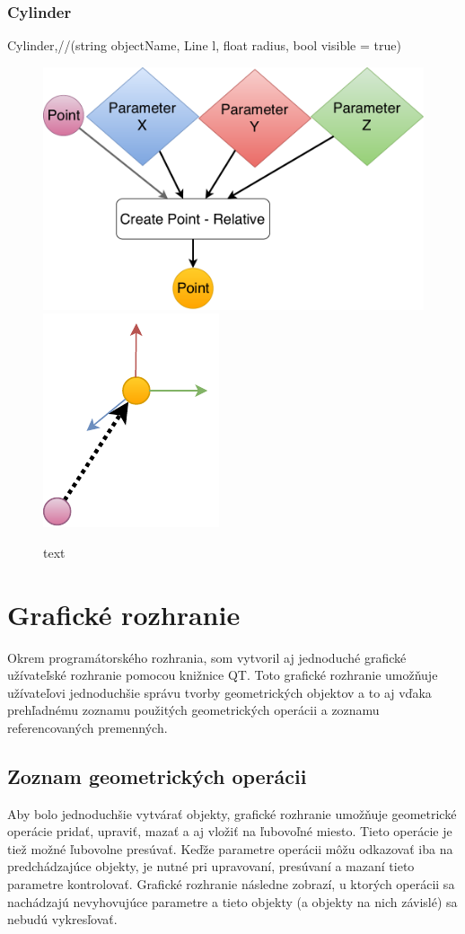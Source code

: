 \subsection{Cylinder}
Cylinder,//(string objectName, Line l, float radius, bool visible = true)

\begin{figure}[H]
	\centering
	\includegraphics[height=0.3\textwidth]{obrazky-figures/Diagram/DP Navrh operacii-0D - Point2.pdf}
	\includegraphics[height=0.3\textwidth]{obrazky-figures/Diagram/Draw/1Points/DP Navrh operacii-0D - PointRelative.pdf}
	\caption{text}
	\label{fig:1}
\end{figure}




\chapter{Grafické rozhranie}
Okrem programátorského rozhrania, som vytvoril aj jednoduché grafické užívateľské rozhranie pomocou knižnice QT. Toto grafické rozhranie umožňuje užívateľovi jednoduchšie správu tvorby geometrických objektov a to aj vďaka prehľadnému zoznamu použitých geometrických operácii a zoznamu referencovaných premenných. 

\section{Zoznam geometrických operácii}
Aby bolo jednoduchšie vytvárať objekty, grafické rozhranie umožňuje geometrické operácie pridať, upraviť, mazať a aj vložiť na ľubovoľné miesto. Tieto operácie je tiež možné ľubovolne presúvať. Keďže parametre operácii môžu odkazovať iba na predchádzajúce objekty, je nutné pri upravovaní, presúvaní a mazaní tieto parametre kontrolovať. Grafické rozhranie následne zobrazí, u ktorých operácii sa nachádzajú nevyhovujúce parametre a tieto objekty (a objekty na nich závislé) sa nebudú vykresľovať.

